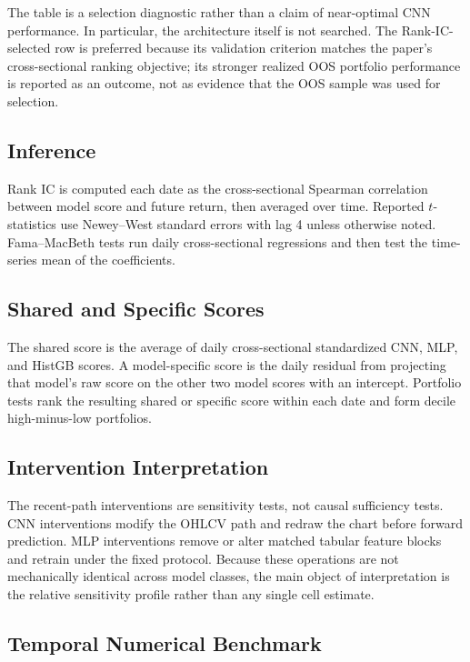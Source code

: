 

The table is a selection diagnostic rather than a claim of near-optimal CNN performance. In particular, the architecture itself is not searched. The Rank-IC-selected row is preferred because its validation criterion matches the paper's cross-sectional ranking objective; its stronger realized OOS portfolio performance is reported as an outcome, not as evidence that the OOS sample was used for selection.

\subsection{Inference}

Rank IC is computed each date as the cross-sectional Spearman correlation between model score and future return, then averaged over time. Reported $t$-statistics use Newey--West standard errors with lag 4 unless otherwise noted. Fama--MacBeth tests run daily cross-sectional regressions and then test the time-series mean of the coefficients.

\subsection{Shared and Specific Scores}

The shared score is the average of daily cross-sectional standardized CNN, MLP, and HistGB scores. A model-specific score is the daily residual from projecting that model's raw score on the other two model scores with an intercept. Portfolio tests rank the resulting shared or specific score within each date and form decile high-minus-low portfolios.

\subsection{Intervention Interpretation}

The recent-path interventions are sensitivity tests, not causal sufficiency tests. CNN interventions modify the OHLCV path and redraw the chart before forward prediction. MLP interventions remove or alter matched tabular feature blocks and retrain under the fixed protocol. Because these operations are not mechanically identical across model classes, the main object of interpretation is the relative sensitivity profile rather than any single cell estimate.

\subsection{Temporal Numerical Benchmark}

